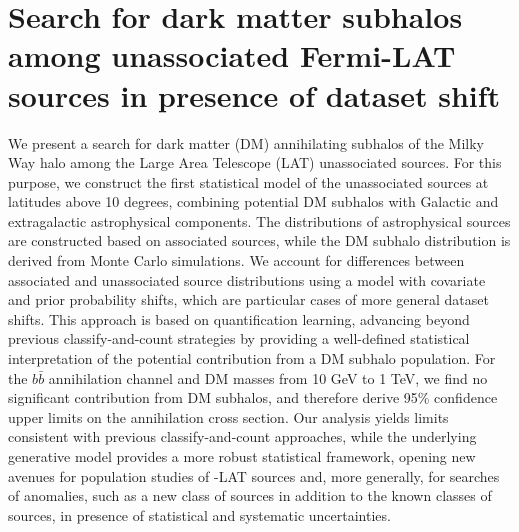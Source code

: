%
\chapter{Search for dark matter subhalos among unassociated Fermi-LAT sources in presence of dataset shift}
\label{ch:dm_halos}

We present a search for dark matter (DM) annihilating subhalos of the Milky Way halo among the {\Fermi} Large Area Telescope (LAT) unassociated sources. For this purpose, we construct the first statistical model of the unassociated sources at latitudes above 10 degrees, combining potential DM subhalos with Galactic and extragalactic astrophysical components. 
The distributions of astrophysical sources are constructed based on associated sources, while the DM subhalo distribution is derived from Monte Carlo simulations. We account for differences between associated and unassociated source distributions using a model with covariate and prior probability shifts, which are particular cases of more general dataset shifts. 
This approach is based on quantification learning, advancing beyond previous classify-and-count strategies by providing a well-defined statistical interpretation of the potential contribution from a DM subhalo population. 
For the $b\bar{b}$ annihilation channel and DM masses from 10 GeV to 1 TeV, we find no significant contribution from DM subhalos, and therefore derive 95\% confidence upper limits on the annihilation cross section.
Our analysis yields limits consistent with previous classify-and-count approaches, 
while the underlying generative model provides a more robust statistical framework, opening new avenues for population studies of \Fermi-LAT sources and, more generally, for searches of anomalies, such as a new class of sources in addition to the known classes of sources, in presence of statistical and systematic uncertainties.







\begin{subappendices}



\end{subappendices}